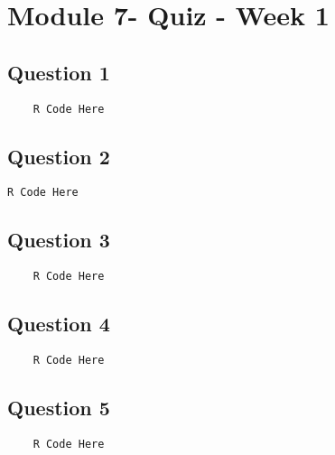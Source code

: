 \documentclass[french]{article}
\begin{document}
\section*{Module 7- Quiz - Week 1}
\subsection*{Question 1}
\begin{framed}
	\begin{verbatim}
	R Code Here
	\end{verbatim}
\end{framed}
\newpage
\subsection*{Question 2}

\begin{framed}
\begin{verbatim}
R Code Here
\end{verbatim}
\end{framed}
\newpage
\subsection*{Question 3}
\begin{framed}
	\begin{verbatim}
	R Code Here
	\end{verbatim}
\end{framed}
\newpage
\subsection*{Question 4}
\begin{framed}
	\begin{verbatim}
	R Code Here
	\end{verbatim}
\end{framed}
\newpage
\subsection*{Question 5}
\begin{framed}
	\begin{verbatim}
	R Code Here
	\end{verbatim}
\end{framed}
\end{document}
